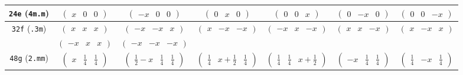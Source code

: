 \documentclass[fleqn,9pt,landscape]{jsarticle}
\begin{document}
\begin{center}
\begin{longtable}{ccccccc}
{\tt 24e} ({\tt 4m.m}) & $ \begin{pmatrix} x & 0 & 0 \end{pmatrix} $ & $ \begin{pmatrix} - x & 0 & 0 \end{pmatrix} $ & $ \begin{pmatrix} 0 & x & 0 \end{pmatrix} $ & $ \begin{pmatrix} 0 & 0 & x \end{pmatrix} $ & $ \begin{pmatrix} 0 & - x & 0 \end{pmatrix} $ & $ \begin{pmatrix} 0 & 0 & - x \end{pmatrix} $ \\ \hline
{\tt 32f} ({\tt .3m}) & $ \begin{pmatrix} x & x & x \end{pmatrix} $ & $ \begin{pmatrix} - x & - x & x \end{pmatrix} $ & $ \begin{pmatrix} x & - x & - x \end{pmatrix} $ & $ \begin{pmatrix} - x & x & - x \end{pmatrix} $ & $ \begin{pmatrix} x & x & - x \end{pmatrix} $ & $ \begin{pmatrix} x & - x & x \end{pmatrix} $ \\
& $ \begin{pmatrix} - x & x & x \end{pmatrix} $ & $ \begin{pmatrix} - x & - x & - x \end{pmatrix} $ & $  $ & $  $ & $  $ & $  $ \\ \hline
{\tt 48g} ({\tt 2.mm}) & $ \begin{pmatrix} x & \frac{1}{4} & \frac{1}{4} \end{pmatrix} $ & $ \begin{pmatrix} \frac{1}{2} - x & \frac{1}{4} & \frac{1}{4} \end{pmatrix} $ & $ \begin{pmatrix} \frac{1}{4} & x + \frac{1}{2} & \frac{1}{4} \end{pmatrix} $ & $ \begin{pmatrix} \frac{1}{4} & \frac{1}{4} & x + \frac{1}{2} \end{pmatrix} $ & $ \begin{pmatrix} - x & \frac{1}{4} & \frac{1}{4} \end{pmatrix} $ & $ \begin{pmatrix} \frac{1}{4} & - x & \frac{1}{4} \end{pmatrix} $ \\

\end{longtable}
\end{center}
\end{document}
